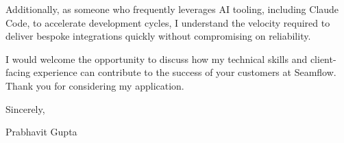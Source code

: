 \documentclass[11pt,a4paper]{article}
\begin{document}
Additionally, as someone who frequently leverages AI tooling, including Claude Code, to accelerate development cycles, I understand the velocity required to deliver bespoke integrations quickly without compromising on reliability.

I would welcome the opportunity to discuss how my technical skills and client-facing experience can contribute to the success of your customers at Seamflow. Thank you for considering my application.

Sincerely,

Prabhavit Gupta
\end{document}
